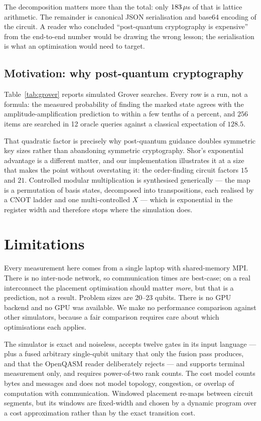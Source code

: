 \documentclass[11pt]{article}
\begin{document}
The decomposition matters more than the total: only $183\,\mu$s of that is
lattice arithmetic. The remainder is canonical JSON serialisation and base64
encoding of the circuit. A reader who concluded ``post-quantum cryptography is
expensive'' from the end-to-end number would be drawing the wrong lesson; the
serialisation is what an optimisation would need to target.

\subsection{Motivation: why post-quantum cryptography}



Table~\ref{tab:grover} reports simulated Grover searches. Every row is a run,
not a formula: the measured probability of finding the marked state agrees with
the amplitude-amplification prediction to within a few tenths of a percent, and
$256$ items are searched in 12 oracle queries against a classical expectation
of $128.5$.

That quadratic factor \cite{grover1996} is precisely why post-quantum guidance
doubles symmetric key sizes rather than abandoning symmetric cryptography.
Shor's exponential advantage \cite{shor1997} is a different matter, and our
implementation illustrates it at a size that makes the point without
overstating it: the order-finding circuit factors $15$ and $21$. Controlled
modular multiplication is synthesised generically --- the map is a permutation
of basis states, decomposed into transpositions, each realised by a CNOT ladder
and one multi-controlled $X$ --- which is exponential in the register width and
therefore stops where the simulation does.

\section{Limitations}
\label{sec:limitations}

Every measurement here comes from a single laptop with shared-memory MPI. There
is no inter-node network, so communication times are best-case; on a real
interconnect the placement optimisation should matter \emph{more}, but that is
a prediction, not a result. Problem sizes are 20--23 qubits. There is no GPU
backend and no GPU was available. We make no performance comparison against
other simulators, because a fair comparison requires care about which
optimisations each applies.

The simulator is exact and noiseless, accepts twelve gates in its input
language --- plus a fused arbitrary single-qubit unitary that only the fusion
pass produces, and that the OpenQASM reader deliberately rejects --- and
supports terminal measurement only, and requires power-of-two rank counts. The cost model counts
bytes and messages and does not model topology, congestion, or overlap of
computation with communication. Windowed placement re-maps between circuit
segments, but its windows are fixed-width and chosen by a dynamic program over
a cost approximation rather than by the exact transition cost.
\end{document}
